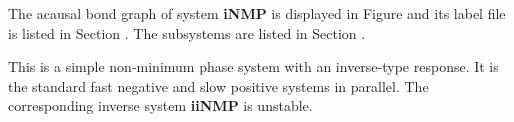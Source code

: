 

   The acausal bond graph of system \textbf{iNMP} is
   displayed in Figure  and its label
   file is listed in Section .
   The subsystems are listed in Section .

This is a simple non-minimum phase system with an inverse-type
response.  It is the standard fast negative and slow positive systems
in parallel. The corresponding inverse system \textbf{iiNMP} is
unstable.


